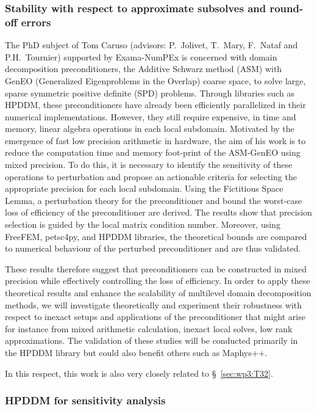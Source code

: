  \subsubsection{Stability with respect to approximate subsolves and round-off errors}
\label{sec:wp3:T31:ddmroundoff}
The PhD subject of Tom Caruso (advisors: P.~Jolivet, T.~Mary, F.~Nataf and P.H.~Tournier) supported by Exama-NumPEx is concerned with domain decomposition preconditioners, the Additive Schwarz method (ASM) with GenEO (Generalized Eigenproblems in the Overlap) coarse space, to solve large, sparse symmetric positive definite (SPD) problems. 
Through libraries such as HPDDM, these preconditioners have already been efficiently parallelized in their numerical implementations. 
However, they still require expensive, in time and memory, linear algebra operations in each local subdomain. 
Motivated by the emergence of fast low precision arithmetic in hardware, the aim of his work is to reduce the computation time and memory foot-print of the ASM-GenEO using mixed precision. 
To do this, it is necessary to identify the sensitivity of these operations to perturbation and propose an actionable criteria for selecting the appropriate precision for each local subdomain.
Using the Fictitious Space Lemma, a perturbation theory for the preconditioner and bound the worst-case loss of efficiency of the preconditioner are derived. The results show that  precision selection is guided by the local matrix condition number. 
Moreover, using FreeFEM, petsc4py, and HPDDM libraries, the theoretical bounds are compared to numerical behaviour of the perturbed preconditioner and are thus validated. 

These results therefore suggest that preconditioners can be constructed in mixed precision while effectively controlling the loss of efficiency. In order to apply these theoretical results and enhance the scalability of
multilevel domain decomposition methods, we will investigate theoretically and experiment their
robustness with respect to inexact setups and applications of the preconditioner that might arise for
instance from mixed arithmetic calculation, inexact local solves, low rank approximations. The
validation of these studies will be conducted primarily in the HPDDM library but could also benefit
others such as Maphys++. 


 In this respect, this work is also very closely related to \S~\ref{sec:wp3:T32}. 


 \subsubsection{HPDDM for sensitivity analysis}
 
